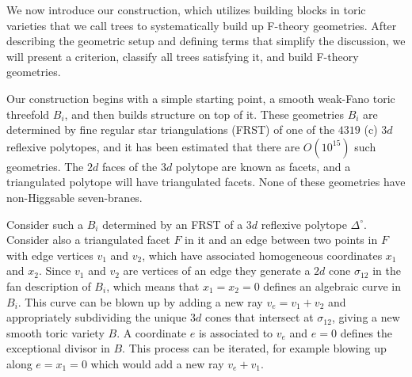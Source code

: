 \documentclass[aps,prl,twocolumn, superscriptaddress,groupedaddress,nofootinbib]{revtex4}
\begin{document}
\vspace{.2cm}

We now introduce our construction, which utilizes
building blocks in toric varieties that we call trees to systematically
build up F-theory geometries. After describing the geometric setup
and defining terms that simplify the discussion, we will present a criterion,
classify all trees satisfying it, and build F-theory geometries.


Our construction  begins with a simple starting point, a smooth weak-Fano toric threefold
$B_i$, and then builds structure on top of it. These geometries $B_i$ are 
determined by
fine regular star triangulations (FRST) of one of the $4319$ (c) $3d$
reflexive polytopes, and it has been estimated \cite{Halverson:2016tve} that there are $O(10^{15})$ such geometries. The $2d$ faces of the $3d$ polytope are known
as facets, and a triangulated polytope will have triangulated facets. 
None of these geometries have non-Higgsable seven-branes.

Consider such a $B_i$ determined by an FRST of a $3d$ reflexive polytope $\Delta^\circ$. Consider also a triangulated facet
$F$ 
in it and an edge between two points in $F$ with
edge vertices $v_1$ and $v_2$, which have associated homogeneous
coordinates $x_1$ and $x_2$. Since  $v_1$ and $v_2$
are vertices of an edge they generate a $2d$ cone $\sigma_{12}$
in the
fan description of $B_i$, which means that $x_1=x_2=0$
defines an algebraic curve in $B_i$. This curve can be blown up by adding a new ray $v_e=v_1+v_2$ and appropriately subdividing the unique $3d$
cones that intersect at $\sigma_{12}$, giving a new smooth
toric variety $B$. A
coordinate $e$ is associated to $v_e$ and $e=0$ defines the
exceptional divisor in $B$. This process can be iterated,
for example blowing up along $e=x_1=0$ which would add a new
ray $v_e+v_1$. 
\end{document}
